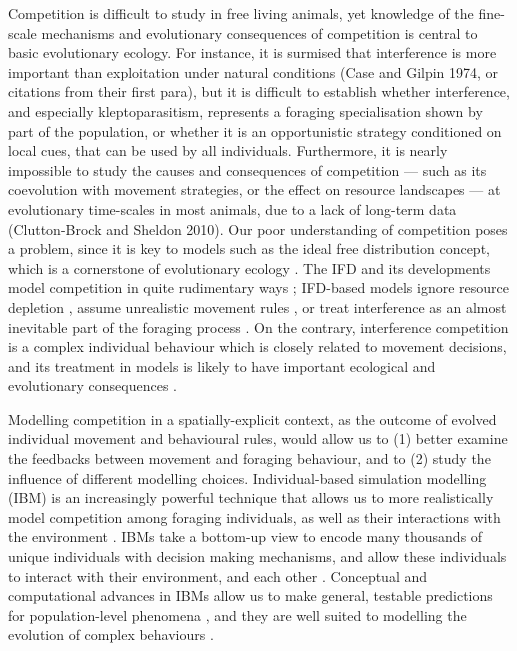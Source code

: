 \documentclass[11pt]{article}
\begin{document}
Competition is difficult to study in free living animals, yet knowledge of the fine-scale mechanisms and evolutionary consequences of competition is central to basic evolutionary ecology.
For instance, it is surmised that interference is more important than exploitation under natural conditions (Case and Gilpin 1974, or citations from their first para), but it is difficult to establish whether interference, and especially kleptoparasitism, represents a foraging specialisation shown by part of the population, or whether it is an opportunistic strategy conditioned on local cues, that can be used by all individuals.
Furthermore, it is nearly impossible to study the causes and consequences of competition --- such as its coevolution with movement strategies, or the effect on resource landscapes --- at evolutionary time-scales in most animals, due to a lack of long-term data (Clutton-Brock and Sheldon 2010).
Our poor understanding of competition poses a problem, since it is key to models such as the ideal free distribution concept, which is a cornerstone of evolutionary ecology \citep{fretwell1970}.
The IFD and its developments model competition in quite rudimentary ways \citep{tregenza1995,cressman2006,fretwell1970,meer1997,matsumura2010,amano2006,garay2010,garay2015,garay2020,folmer2012}; IFD-based models ignore resource depletion \citep{fretwell1970,meer1997,cressman2006}, assume unrealistic movement rules \citep{cressman2006,cressman2014,garay2020}, or treat interference as an almost inevitable part of the foraging process \citep[reviewed in][; see also \citealt{cressman2006, garay2020}]{meer1997, tregenza1995}.
On the contrary, interference competition is a complex individual behaviour which is closely related to movement decisions, and its treatment in models is likely to have important ecological and evolutionary consequences \citep{meer1997}.

Modelling competition in a spatially-explicit context, as the outcome of evolved individual movement and behavioural rules, would allow us to (1) better examine the feedbacks between movement and foraging behaviour, and to (2) study the influence of different modelling choices.
Individual-based simulation modelling (IBM) is an increasingly powerful technique that allows us to more realistically model competition among foraging individuals, as well as their interactions with the environment \citep{deangelis2005,deangelis2018,grimm2017,railsback2020,huston1988}.
IBMs take a bottom-up view to encode many thousands of unique individuals with decision making mechanisms, and allow these individuals to interact with their environment, and each other \citep{huston1988,deangelis2019}.
Conceptual and computational advances in IBMs \citep[][]{deangelis2018,deangelis2005} allow us to make general, testable predictions for population-level phenomena \citep[e.g. animal space use, or life-history strategies; see][]{spiegel2017,schaefer2018,folmer2012}, and they are well suited to modelling the evolution of complex behaviours \citep{netz2020,guttal2010,getz2016,getz2015}.
\end{document}
